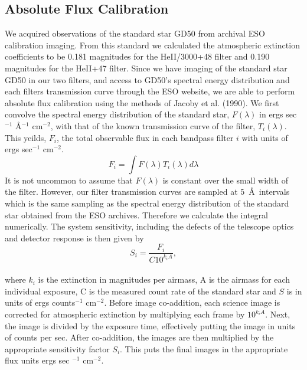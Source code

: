 \documentclass[twocolumn]{aastex6}
\begin{document}
\subsection{Absolute Flux Calibration}
We acquired observations of the standard star GD50 from archival ESO calibration imaging. From this standard we calculated the atmospheric extinction coefficients to be 0.181 magnitudes for the HeII/3000+48 filter and 0.190 magnitudes for the HeII+47 filter. Since we have imaging of the standard star GD50 in our two filters, and access to GD50's spectral energy distribution and each filters transmission curve through the ESO website, we are able to perform absolute flux calibration using the methods of Jacoby et al. (1990). We first convolve the spectral energy distribution of the standard star, $F(\lambda)$ in ergs sec$^{-1}$ \AA$^{-1}$ cm$^{-2}$, with that of the known transmission curve of the filter, $T_{i}(\lambda)$. This yeilds, $F_i$, the total observable flux in each bandpass filter $i$ with units of ergs sec$^{-1}$ cm$^{-2}$.
\begin{equation*}
F_{i}=\int F(\lambda)T_{i}(\lambda)d\lambda
\end{equation*}
It is not uncommon to assume that $F(\lambda)$ is constant over the small width of the filter. However, our filter transmission curves are sampled at $5$\ \AA\ intervals which is the same sampling as the spectral energy distribution of the standard star obtained from the ESO archives. Therefore we calculate the integral numerically.
The system sensitivity, including the defects of the telescope optics and detector response is then given by
\begin{equation*}
S_{i}=\dfrac{F_{i}}{C10^{k_{i}A}},
\end{equation*}\\
where $k_i$ is the extinction in magnitudes per airmass, A is the airmass for each individual exposure, C is the measured count rate of the standard star and $S$ is in units of ergs counts$^{-1}$ cm$^{-2}$. Before image co-addition, each science image is corrected for atmospheric extinction by multiplying each frame by $10^{k_{i}A}$. Next, the image is divided by the exposure time, effectively putting the image in units of counts per sec. After co-addition, the images are then multiplied by the appropriate sensitivity factor $S_{i}$. This puts the final images in the appropriate flux units ergs sec $^{-1}$ cm$^{-2}$.
\end{document}
